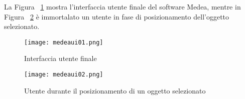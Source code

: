 La Figura ~\ref{label:medeaui01} mostra l'interfaccia utente finale del software Medea, mentre in Figura ~\ref{label:medeaui02} è immortalato un utente in fase di posizionamento dell'oggetto selezionato. 

\begin{figure}[Ht]
\centering
\texttt{[image: medeaui01.png]}
\caption{Interfaccia utente finale}
\label{label:medeaui01}
\end{figure}

\begin{figure}[Ht]
\centering
\texttt{[image: medeaui02.png]}
\caption{Utente durante il posizionamento di un oggetto selezionato}
\label{label:medeaui02}
\end{figure}


